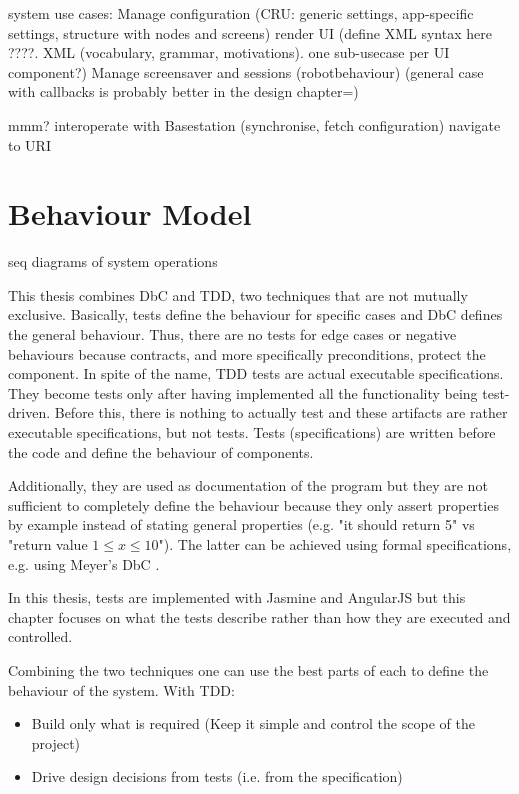 system use cases:
Manage configuration (CRU: generic settings, app-specific settings, structure with nodes and screens)
render UI (define XML syntax here ????. XML (vocabulary, grammar, motivations). one sub-usecase per UI component?)
Manage screensaver and sessions (robotbehaviour) (general case with callbacks is probably better in the design chapter=)

mmm?
interoperate with Basestation (synchronise, fetch configuration)
navigate to URI



\section{Behaviour Model}
seq diagrams of system operations

This thesis combines \ac{DbC} and \ac{TDD}, two techniques that are not mutually exclusive.
Basically, tests define the behaviour for specific cases and \ac{DbC} defines the general behaviour. 
Thus, there are no tests for edge cases or negative behaviours because contracts, and more specifically preconditions, protect the component.
In spite of the name, \ac{TDD} tests are actual executable specifications.
They become tests only after having implemented all the functionality being test-driven.
Before this, there is nothing to actually test and these artifacts are rather executable specifications, but not tests.
Tests (specifications) are written before the code and define the behaviour of components.

Additionally, they are used as documentation of the program but they are not sufficient to completely define the behaviour because they only assert properties by example instead of stating general properties (e.g. "it should return 5" vs "return value $1 \leq x \leq 10$"). The latter can be achieved using formal specifications,
e.g. using Meyer's \ac{DbC} \cite{Baumeister:2004}.

In this thesis, tests are implemented with Jasmine and AngularJS but this chapter focuses on what the tests describe rather than how they are executed and controlled.

Combining the two techniques one can use the best parts of each to define the behaviour of the system.
With \ac{TDD}:
\begin{itemize}
    \item Build only what is required (Keep it simple and control the scope of the project)
    \item Drive design decisions from tests (i.e. from the specification)
\end{itemize}

